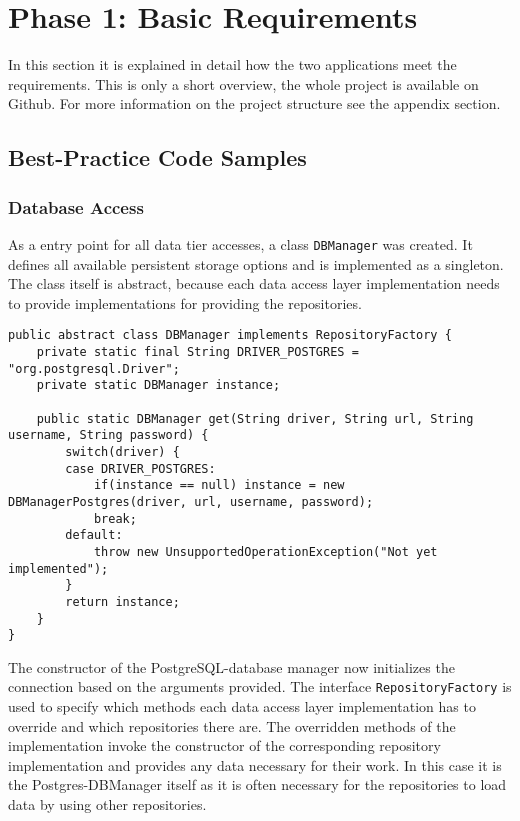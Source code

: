 \clearpage
\section{Phase 1: Basic Requirements}
\label{sec:code-samples}
In this section it is explained in detail how the two applications meet the requirements. This is only a short overview, the whole project is available on Github. For more information on the project structure see the appendix section.

\subsection{Best-Practice Code Samples}

\subsubsection{Database Access}
As a entry point for all data tier accesses, a class \texttt{DBManager} was created. It defines all available persistent storage options and is implemented as a singleton. The class itself is abstract, because each data access layer implementation needs to provide implementations for providing the repositories.
\begin{lstlisting}[caption={DBManager singleton class. Used for instantiating the implementation of the chosen interface.}, captionpos=b, label={lst:dbmanager}]
public abstract class DBManager implements RepositoryFactory {
	private static final String DRIVER_POSTGRES = "org.postgresql.Driver";
	private static DBManager instance;
	
	public static DBManager get(String driver, String url, String username, String password) {
		switch(driver) {
		case DRIVER_POSTGRES:
			if(instance == null) instance = new DBManagerPostgres(driver, url, username, password);
			break;
		default:
			throw new UnsupportedOperationException("Not yet implemented");
		}
		return instance;
	}
}
\end{lstlisting}

The constructor of the PostgreSQL-database manager now initializes the connection based on the arguments provided. The interface \texttt{RepositoryFactory} is used to specify which methods each data access layer implementation has to override and which repositories there are. The overridden methods of the implementation invoke the constructor of the corresponding repository implementation and provides any data necessary for their work. In this case it is the Postgres-DBManager itself as it is often necessary for the repositories to load data by using other repositories.

